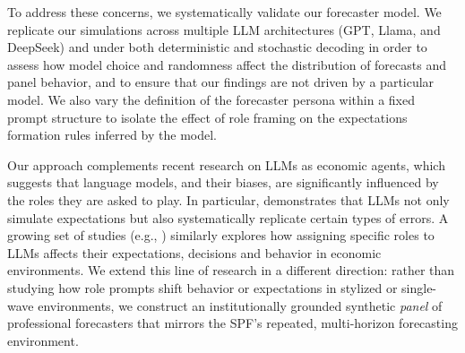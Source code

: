 \documentclass[11pt,letterpaper]{scrartcl}
\begin{document}
To address these concerns, we systematically validate our forecaster model. We replicate our simulations across multiple LLM architectures (GPT, Llama, and DeepSeek) and under both deterministic and stochastic decoding in order to assess how model choice and randomness affect the distribution of forecasts and panel behavior, and to ensure that our findings are not driven by a particular model. We also vary the definition of the forecaster persona within a fixed prompt structure to isolate the effect of role framing on the expectations formation rules inferred by the model. 

Our approach complements recent research on LLMs as economic agents, which suggests that language models, and their biases, are significantly influenced by the roles they are asked to play. In particular, \cite{bybeeghost} demonstrates that LLMs not only simulate expectations but also systematically replicate certain types of errors. A growing set of studies (e.g., \citealp{kazinnik2023bank, cook2024bias, fedyk2024chatgpt, zarifhonarvar2024experimental}) similarly explores how assigning specific roles to LLMs affects their expectations, decisions and behavior in economic environments. We extend this line of research in a different direction: rather than studying how role prompts shift behavior or expectations in stylized or single-wave environments, we construct an institutionally grounded synthetic \textit{panel} of professional forecasters that mirrors the SPF's repeated, multi-horizon forecasting environment. 
\end{document}
